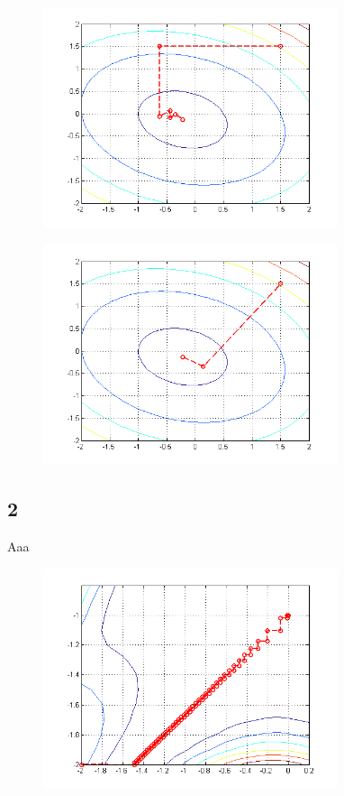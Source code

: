 \documentclass[journal]{IEEEtran}
\begin{document}
\begin{figure}
\centering
\includegraphics[width=3.4in]{figures/2d-powellsMethod.png}
\caption{}
\label{figPM}
\end{figure}

\begin{figure}
\centering
\includegraphics[width=3.4in]{figures/2d-conjugateGradient.png}
\caption{}
\label{figCG}
\end{figure}

\subsection{2}

Aaa

\begin{figure}
\centering
\includegraphics[width=3.4in]{figures/2d2-arbitraryLineSearch.png}
\caption{}
\label{figALS2}
\end{figure}
\end{document}
